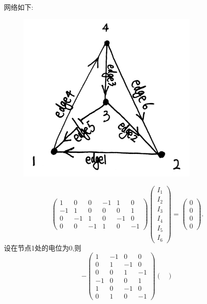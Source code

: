 ﻿\documentclass{book} \usepackage{exsheets} \usepackage{xeCJK}
\begin{document}
\begin{solution}
  网络如下:
  \begin{figure}[h]
    \centering
    \includegraphics[width=0.8\textwidth]{1.png}
    \caption{ }
    \label{fig:2.5.16.1}
  \end{figure}
$$
\begin{pmatrix}
  1&0&0&-1&1&0\\
  -1&1&0&0&0&1\\
  0&-1&1&0&-1&0\\
  0&0&-1&1&0&-1
\end{pmatrix}
\begin{pmatrix}
  I_1\\
  I_2\\
  I_3\\
  I_4\\
  I_5\\
  I_6
\end{pmatrix}=
\begin{pmatrix}
  0\\
  0\\
  0\\
  0
\end{pmatrix}.
$$
设在节点1处的电位为$0$,则
$$
-\begin{pmatrix}
  1&-1&0&0\\
  0&1&-1&0\\
  0&0&1&-1\\
  -1&0&0&1\\
  1&0&-1&0\\
  0&1&0&-1
\end{pmatrix}
\begin{pmatrix}

\end{pmatrix}$$
\end{solution}
\end{document}
